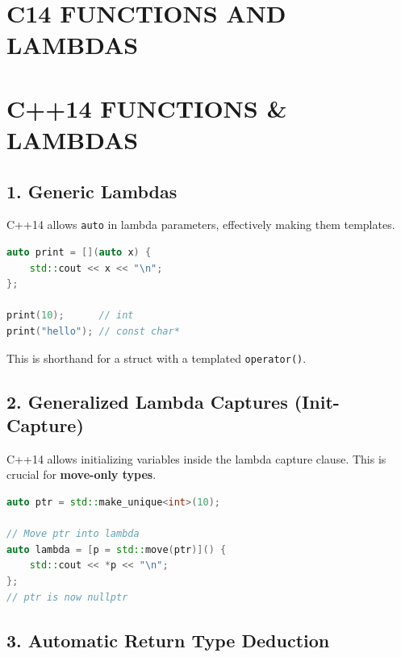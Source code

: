 \hypertarget{c14-functions-and-lambdas}{%
\chapter{C14 FUNCTIONS AND LAMBDAS}\label{c14-functions-and-lambdas}}

\hypertarget{c14-functions-lambdas}{%
\chapter{C++14 FUNCTIONS \& LAMBDAS}\label{c14-functions-lambdas}}

\hypertarget{generic-lambdas}{%
\section{1. Generic Lambdas}\label{generic-lambdas}}

C++14 allows \passthrough{\lstinline!auto!} in lambda parameters,
effectively making them templates.

\begin{lstlisting}[language={C++}]
auto print = [](auto x) {
    std::cout << x << "\n";
};

print(10);      // int
print("hello"); // const char*
\end{lstlisting}

This is shorthand for a struct with a templated
\passthrough{\lstinline!operator()!}.

\hypertarget{generalized-lambda-captures-init-capture}{%
\section{2. Generalized Lambda Captures
(Init-Capture)}\label{generalized-lambda-captures-init-capture}}

C++14 allows initializing variables inside the lambda capture clause.
This is crucial for \textbf{move-only types}.

\begin{lstlisting}[language={C++}]
auto ptr = std::make_unique<int>(10);

// Move ptr into lambda
auto lambda = [p = std::move(ptr)]() {
    std::cout << *p << "\n";
};
// ptr is now nullptr
\end{lstlisting}

\hypertarget{automatic-return-type-deduction}{%
\section{3. Automatic Return Type
Deduction}\label{automatic-return-type-deduction}}

